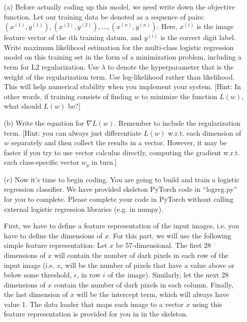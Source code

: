 \documentclass[10pt]{report}
\begin{document}
\begin{enumerate}
\begin{enumerate}
\item[(a)] Before actually coding up this model, we need write down the objective function. Let our training data be denoted as a sequence of pairs: $(x^{(1)},y^{(1)}), (x^{(2)},y^{(2)}), \ldots, (x^{(n)},y^{(n)})$. Here, $x^{(i)}$ is the image feature vector of the $i$th training datum, and $y^{(i)}$ is the correct digit label. Write maximum likelihood estimation for the multi-class logistic regression model on this training set in the form of a minimization problem, including a term for L2 regularization. Use $\lambda$ to denote the hyperparameter that is the weight of the regularization term. Use log-likelihood rather than likelihood. This will help numerical stability when you implement your system. [Hint: In other words, if training consists of finding $w$ to minimize the function $L(w)$, what should $L(w)$ be?]
\begin{solution}

\end{solution}

\vspace{1em}

\item[(b)] Write the equation for $\nabla L(w)$. Remember to include the regularization term. [Hint: you can always just differentiate $L(w)$ w.r.t. each dimension of $w$ separately and then collect the results in a vector. However, it may be faster if you try to use vector calculus directly, computing the gradient w.r.t. each class-specific vector $w_y$ in turn.]
\begin{solution}

\end{solution}

\vspace{1em}

\item[(c)] Now it's time to begin coding. You are going to build and train a logistic regression classifier. We have provided skeleton PyTorch code in ``logreg.py'' for you to complete. Please complete your code in PyTorch without calling external logistic regression libraries (e.g. in numpy).

\vspace{0.5em}
First, we have to define a feature representation of the input images, i.e. you have to define the dimensions of $x$. For this part, we will use the following simple feature representation: Let $x$ be 57-dimensional. The first 28 dimensions of $x$ will contain the number of dark pixels in each row of the input image (i.e. $x_i$ will be the number of pixels that have a value above or below some threshold, $\epsilon$, in row $i$ of the image). Similarly, let the next 28 dimensions of $x$ contain the number of dark pixels in each column. Finally, the last dimension of $x$ will be the intercept term, which will always have value 1. The data loader that maps each image to a vector $x$ using this feature representation is provided for you in in the skeleton. 
 

\end{enumerate}
\end{enumerate}
\end{document}
